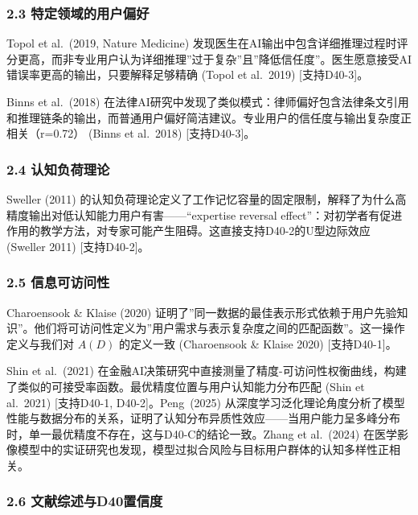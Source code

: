 \documentclass[UTF8, fontset=fandol]{ctexart}
\begin{document}
\subsubsection{2.3
特定领域的用户偏好}\label{ux7279ux5b9aux9886ux57dfux7684ux7528ux6237ux504fux597d}

Topol et al.~(2019, Nature Medicine)
发现医生在AI输出中包含详细推理过程时评分更高，而非专业用户认为详细推理''过于复杂''且''降低信任度''。医生愿意接受AI错误率更高的输出，只要解释足够精确
(Topol et al.~2019) {[}支持D40-3{]}。

Binns et al.~(2018)
在法律AI研究中发现了类似模式：律师偏好包含法律条文引用和推理链条的输出，而普通用户偏好简洁建议。专业用户的信任度与输出复杂度正相关（r=0.72）
(Binns et al.~2018) {[}支持D40-3{]}。

\subsubsection{2.4
认知负荷理论}\label{ux8ba4ux77e5ux8d1fux8377ux7406ux8bba}

Sweller (2011)
的认知负荷理论定义了工作记忆容量的固定限制，解释了为什么高精度输出对低认知能力用户有害------``expertise
reversal
effect''：对初学者有促进作用的教学方法，对专家可能产生阻碍。这直接支持D40-2的U型边际效应
(Sweller 2011) {[}支持D40-2{]}。

\subsubsection{2.5
信息可访问性}\label{ux4fe1ux606fux53efux8bbfux95eeux6027}

Charoensook \& Klaise (2020)
证明了''同一数据的最佳表示形式依赖于用户先验知识''。他们将可访问性定义为''用户需求与表示复杂度之间的匹配函数''。这一操作定义与我们对
\(A(D)\) 的定义一致 (Charoensook \& Klaise 2020) {[}支持D40-1{]}。

Shin et al.~(2021)
在金融AI决策研究中直接测量了精度-可访问性权衡曲线，构建了类似的可接受率函数。最优精度位置与用户认知能力分布匹配
(Shin et al.~2021) {[}支持D40-1, D40-2{]}。Peng~(2025) 从深度学习泛化理论角度分析了模型性能与数据分布的关系，证明了认知分布异质性效应——当用户能力呈多峰分布时，单一最优精度不存在，这与D40-C的结论一致。Zhang et al.~(2024) 在医学影像模型中的实证研究也发现，模型过拟合风险与目标用户群体的认知多样性正相关。

\subsubsection{2.6
文献综述与D40置信度}\label{ux6587ux732eux7efcux8ff0ux4e0ed40ux7f6eux4fe1ux5ea6}
\end{document}
